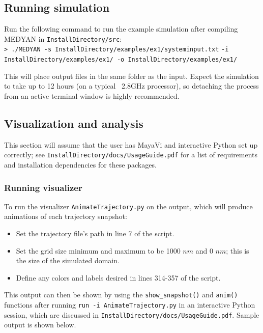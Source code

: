 \documentclass[11pt, oneside]{article}   	%
\begin{document}
\subsection{Running simulation}

Run the following command to run the example simulation after compiling MEDYAN in \texttt{InstallDirectory/src}:\\

\indent \texttt{> ./MEDYAN -s InstallDirectory/examples/ex1/systeminput.txt}\newline
\indent\indent \texttt{-i InstallDirectory/examples/ex1/  -o InstallDirectory/examples/ex1/}\newline

\noindent This will place output files in the same folder as the input. Expect the simulation to take up to 12 hours (on a typical ~2.8GHz processor), so detaching the process from an active terminal window is highly recommended.

\subsection{Visualization and analysis}

This section will assume that the user has MayaVi and interactive Python set up correctly; see \texttt{InstallDirectory/docs/UsageGuide.pdf} for a list of requirements and installation dependencies for these packages. 

\subsubsection{Running visualizer}

To run the visualizer \texttt{AnimateTrajectory.py} on the output, which will produce animations of each trajectory snapshot:

\begin{itemize}
\item Set the trajectory file's path in line 7 of the script.
\item Set the grid size minimum and maximum to be 1000 $nm$ and 0 $nm$; this is the size of the simulated domain.
\item Define any colors and labels desired in lines 314-357 of the script.
\end{itemize}

This output can then be shown by using the \texttt{show\_snapshot()} and \texttt{anim()} functions after running \texttt{run -i AnimateTrajectory.py} in an interactive Python session, which are discussed in \texttt{InstallDirectory/docs/UsageGuide.pdf}. Sample output is shown below. 
\end{document}

